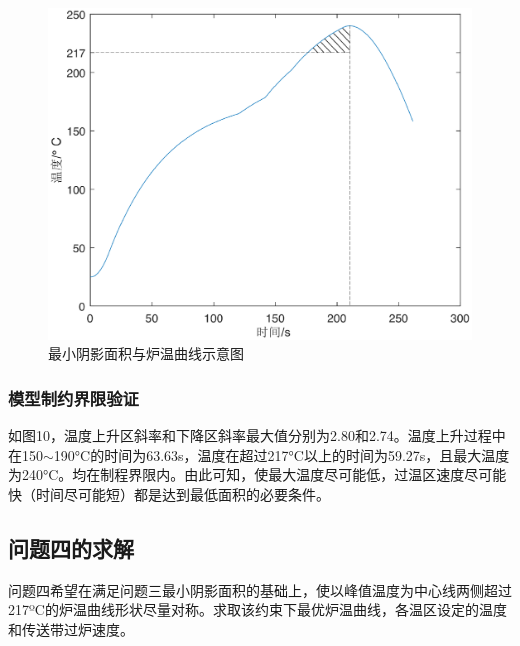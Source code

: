 \documentclass[a4paper,12pt]{ctexart} %
\begin{document}
	\begin{figure}[H]
		\centering
		\includegraphics[scale=0.5]{Q3-shadow}
		\caption{最小阴影面积与炉温曲线示意图}
	\end{figure}\par
	\subsubsection{模型制约界限验证}
	如图10，温度上升区斜率和下降区斜率最大值分别为2.80和2.74。温度上升过程中在150$\sim$190°C的时间为63.63s，温度在超过217°C以上的时间为59.27s，且最大温度为240°C。均在制程界限内。由此可知，使最大温度尽可能低，过温区速度尽可能快（时间尽可能短）都是达到最低面积的必要条件。\par
	\subsection{问题四的求解}
	问题四希望在满足问题三最小阴影面积的基础上，使以峰值温度为中心线两侧超过217ºC的炉温曲线形状尽量对称。求取该约束下最优炉温曲线，各温区设定的温度和传送带过炉速度。\par
\end{document}
